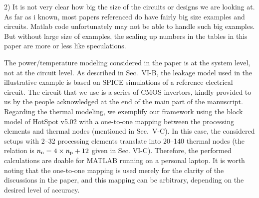 \begin{reviewer}
2) It is not very clear how big the size of the circuits or designs we are looking at.
As far as i known, most papers referenced do have fairly big size examples and circuits. Matlab code unfortunately may not be able to handle such big examples.
But without large size of examples, the scaling up numbers in the tables in this paper are more or less like speculations.
\end{reviewer}
\begin{authors}
The power/temperature modeling considered in the paper is at the system level, not at the circuit level.
As described in Sec.~VI-B, the leakage model used in the illustrative example is based on SPICE simulations of a reference electrical circuit.
The circuit that we use is a series of CMOS invertors, kindly provided to us by the people acknowledged at the end of the main part of the manuscript.
Regarding the thermal modeling, we exemplify our framework using the block model of HotSpot v5.02 with a one-to-one mapping between the processing elements and thermal nodes (mentioned in Sec.~V-C).
In this case, the considered setups with 2--32 processing elements translate into 20--140 thermal nodes (the relation is ${n_\text{n}} = 4 \times {n_\text{p}} + 12$ given in Sec. VI-C).
Therefore, the performed calculations are doable for MATLAB running on a personal laptop.
It is worth noting that the one-to-one mapping is used merely for the clarity of the discussions in the paper, and this mapping can be arbitrary, depending on the desired level of accuracy.


\end{authors}

